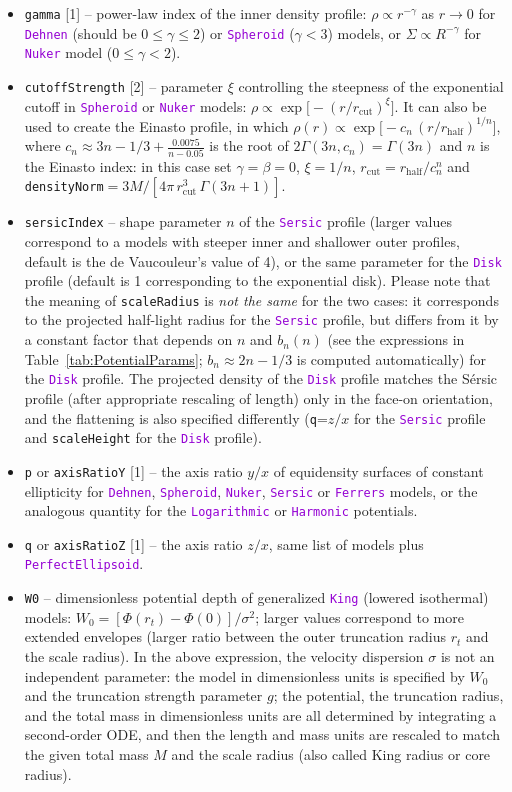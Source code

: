 \documentclass[12pt]{article}
\newcommand{\ttt}[1]{\textcolor{darkviolet}{\texttt{#1}}}
\newcommand{\ppp}[1]{\textcolor{darkolive} {\texttt{#1}}}
\begin{document}
\begin{itemize}
\item \ppp{gamma} [1] -- power-law index of the inner density profile: $\rho \propto r^{-\gamma}$ as $r\to 0$ for \ttt{Dehnen} (should be $0\le\gamma\le 2$) or \ttt{Spheroid} ($\gamma<3$) models, or $\Sigma \propto R^{-\gamma}$ for \ttt{Nuker} model ($0\le \gamma < 2$).
\item \ppp{cutoffStrength} [2] -- parameter $\xi$ controlling the steepness of the exponential cutoff in \ttt{Spheroid} or \ttt{Nuker} models: $\rho \propto \exp\big[-(r/r_\mathrm{cut})^\xi\big]$. It can also be used to create the Einasto profile, in which $\rho(r)\propto \exp\big[-c_n\,(r/r_\mathrm{half})^{1/n}\big]$, where $c_n\approx 3n-1/3+\frac{0.0075}{n-0.05}$ is the root of $2\Gamma(3n,c_n)=\Gamma(3n)$ and $n$ is the Einasto index: in this case set $\gamma=\beta=0$, $\xi=1/n$, $r_\mathrm{cut}=r_\mathrm{half}/c_n^n$ and \ppp{densityNorm}${}=3M / [4\pi\,r_\mathrm{cut}^3\,\Gamma(3n+1)]$.
\item \ppp{sersicIndex} -- shape parameter $n$ of the \ttt{Sersic} profile (larger values correspond to a models with steeper inner and shallower outer profiles, default is the de Vaucouleur's value of 4), or the same parameter for the \ttt{Disk} profile (default is 1 corresponding to the exponential disk). Please note that the meaning of \ppp{scaleRadius} is \textit{not the same} for the two cases: it corresponds to the projected half-light radius for the \ttt{Sersic} profile, but differs from it by a constant factor that depends on $n$ and $b_n(n)$ (see the expressions in Table~\ref{tab:PotentialParams}; $b_n\approx 2n-1/3$ is computed automatically) for the \ttt{Disk} profile. The projected density of the \ttt{Disk} profile matches the S\'ersic profile (after appropriate rescaling of length) only in the face-on orientation, and the flattening is also specified differently (\ppp{q}=$z/x$ for the \ttt{Sersic} profile and \ppp{scaleHeight} for the \ttt{Disk} profile).
\item \ppp{p} or \ppp{axisRatioY} [1] -- the axis ratio $y/x$ of equidensity surfaces of constant ellipticity for \ttt{Dehnen}, \ttt{Spheroid}, \ttt{Nuker}, \ttt{Sersic} or \ttt{Ferrers} models, or the analogous quantity for the \ttt{Logarithmic} or \ttt{Harmonic} potentials.
\item \ppp{q} or \ppp{axisRatioZ} [1] -- the axis ratio $z/x$, same list of models plus \ttt{PerfectEllipsoid}.
\item \ppp{W0} -- dimensionless potential depth of generalized \ttt{King} (lowered isothermal) models: $W_0 = [ \Phi(r_t) - \Phi(0) ] / \sigma^2$; larger values correspond to more extended envelopes (larger ratio between the outer truncation radius $r_t$ and the scale radius). In the above expression, the velocity dispersion $\sigma$ is not an independent parameter: the model in dimensionless units is specified by $W_0$ and the truncation strength parameter $g$; the potential, the truncation radius, and the total mass in dimensionless units are all determined by integrating a second-order ODE, and then the length and mass units are rescaled to match the given total mass $M$ and the scale radius (also called King radius or core radius).

\end{itemize}
\end{document}
